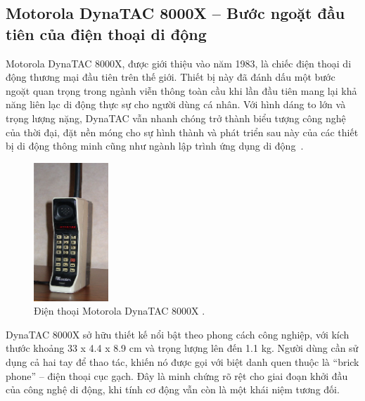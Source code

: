 \subsection{Motorola DynaTAC 8000X – Bước ngoặt đầu tiên của điện thoại di động}
\renewcommand{\labelitemi}{--}    
\begin{flushleft}
    \hspace*{0.8cm}Motorola DynaTAC 8000X, được giới thiệu vào năm 1983, là chiếc điện thoại di động thương mại đầu tiên trên thế giới. Thiết bị này đã đánh dấu một bước ngoặt quan trọng trong ngành viễn thông toàn cầu khi lần đầu tiên mang lại khả năng liên lạc di động thực sự cho người dùng cá nhân. Với hình dáng to lớn và trọng lượng nặng, DynaTAC vẫn nhanh chóng trở thành biểu tượng công nghệ của thời đại, đặt nền móng cho sự hình thành và phát triển sau này của các thiết bị di động thông minh cũng như ngành lập trình ứng dụng di động~\cite{motorola1983}.
\end{flushleft}

\begin{figure}[H]
  \centering
  \includegraphics[width=0.25\textwidth]{images/DynaTAC8000X.png}
  \caption{Điện thoại Motorola DynaTAC 8000X \cite{wikiDynaTAC}.}
  \label{fig:fig4}
\end{figure}

\begin{flushleft}
  \hspace*{0.8cm}DynaTAC 8000X sở hữu thiết kế nổi bật theo phong cách công nghiệp, với kích thước khoảng 33 x 4.4 x 8.9 cm và trọng lượng lên đến 1.1 kg. Người dùng cần sử dụng cả hai tay để thao tác, khiến nó được gọi với biệt danh quen thuộc là “brick phone” – điện thoại cục gạch. Đây là minh chứng rõ rệt cho giai đoạn khởi đầu của công nghệ di động, khi tính cơ động vẫn còn là một khái niệm tương đối.
\end{flushleft}


